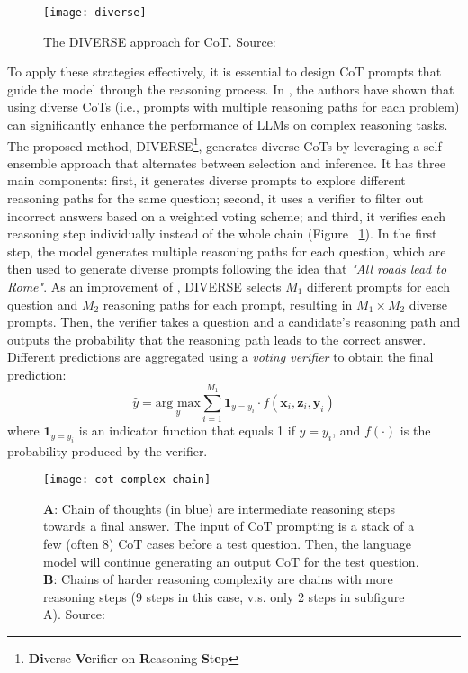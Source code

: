 \begin{figure}[h!]
	\centering
	\texttt{[image: diverse]}
	\caption{The DIVERSE approach for CoT. Source: \textcite{li2022making}}
	\label{fig:diverse}
\end{figure}

To apply these strategies effectively, it is essential to design CoT prompts that guide the model through the reasoning process.
In \textcite{li2022making}, the authors have shown that using diverse CoTs (i.e., prompts with multiple reasoning paths for each problem) can significantly enhance the performance of LLMs on complex reasoning tasks.
The proposed method, DIVERSE\footnote{\textbf{Di}verse \textbf{Ve}rifier on \textbf{R}easoning \textbf{S}t\textbf{e}p}, generates diverse CoTs by leveraging a self-ensemble approach that alternates between selection and inference.
It has three main components: first, it generates diverse prompts to explore different reasoning paths for the same question; second, it uses a verifier to filter out incorrect answers based on a weighted voting scheme; and third, it verifies each reasoning step individually instead of the whole chain (Figure ~\ref{fig:diverse}).
In the first step, the model generates multiple reasoning paths for each question, which are then used to generate diverse prompts following the idea that \textit{"All roads lead to Rome"}.
As an improvement of \textcite{wang2022self}, DIVERSE selects $M_1$ different prompts for each question and $M_2$ reasoning paths for each prompt, resulting in $M_1 \times M_2$ diverse prompts.
Then, the verifier takes a question and a candidate's reasoning path and outputs the probability that the reasoning path leads to the correct answer.
Different predictions are aggregated using a \textit{voting verifier} to obtain the final prediction:
\begin{equation}
	\hat{y} = \underset{y}{\text{arg max}} \sum_{i=1}^{M_1} \textbf{1}_{y = y_{i}} \cdot f(\textbf{x}_i, \textbf{z}_i, \textbf{y}_i)
	\label{eq:diverse}
\end{equation}
where $\textbf{1}_{y = y_{i}}$ is an indicator function that equals 1 if $y = y_{i}$, and $f(\cdot)$ is the probability produced by the verifier.

\begin{figure}[h!]
	\centering
	\texttt{[image: cot-complex-chain]}
	\caption{\textbf{A}: Chain of thoughts (in blue) are intermediate reasoning steps towards a final answer. The input of CoT prompting is a stack of a few (often 8) CoT cases before a test question. Then, the language model will continue generating an output CoT for the test question. \textbf{B}: Chains of harder reasoning complexity are chains with more reasoning steps (9 steps in this case, v.s. only 2 steps in subfigure A). Source: \textcite{fu2022complexity}}
	\label{fig:cot-complex-chain}
\end{figure}

